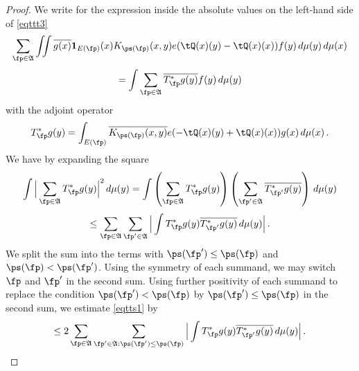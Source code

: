 \begin{proof}
\leanok
We write for the expression inside the absolute values on the left-hand side of \eqref{eqttt3}
\begin{equation}
  \sum_{\fp \in \mathfrak{A}}\iint \overline{g(x)} \mathbf{1}_{E(\fp)}(x)
  {K_{\ps(\fp)}(x,y)}e(\tQ(x)(y) -
   \tQ(x)(x))
   f(y)\, d\mu(y)\,d\mu(x)
\end{equation}
\begin{equation}
  =\int \sum_{\fp \in \mathfrak{A}} \overline{T_{\fp} ^*g(y)} f(y)\, d\mu(y)
\end{equation}
with the adjoint operator
\begin{equation}\label{eq-tstarwritten}
    T_{\fp}^*g(y)=\int_{E(\fp)} \overline{K_{\ps(\fp)}(x,y)}e(-\tQ(x)(y)+
    \tQ(x)(x))g(x)\, d\mu(x)\, .
\end{equation}
We have by expanding the square
\begin{equation}
    \int \Big|\sum_{\fp\in \mathfrak{A}}T^*_{\fp}g(y)\Big|^2\, d\mu(y)=
    \int \left(\sum_{\fp\in \mathfrak{A}} T^*_{\fp}g(y)\right)
    \left(\sum_{\fp'\in \mathfrak{A}}\overline{T^*_{\fp'}g(y)}\right)\, d\mu(y)
\end{equation}
\begin{equation}\label{eqtts1}
    \le \sum_{\fp\in \mathfrak{A}} \sum_{\fp'\in \mathfrak{A}}
    \Big|\int T^*_{\fp}g(y)\overline{T^*_{\fp'}g(y)}\, d\mu(y)\Big|\,.
\end{equation}
We split the sum into the terms with $\ps(\fp')\le \ps(\fp)$
and $\ps(\fp)< \ps(\fp')$. Using the symmetry of each summand,
we may switch $\fp$ and $\fp'$ in the second sum. Using further positivity
of each summand to replace the condition $\ps(\fp')< \ps(\fp)$
by $\ps(\fp')\le \ps(\fp)$ in the second sum, we estimate \eqref{eqtts1} by
\begin{equation}\label{eqtts2}
    \le2 \sum_{\fp\in \mathfrak{A}} \sum_{\fp'\in \mathfrak{A}: \ps(\fp')\le \ps(\fp)}
    \Big|\int T^*_{\fp}g(y)\overline{T^*_{\fp'}g(y)}\, d\mu(y)\Big|\,.
\end{equation}


\end{proof}
